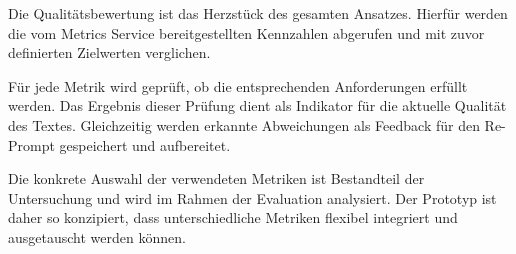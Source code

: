 
Die Qualitätsbewertung ist das Herzstück des gesamten Ansatzes.
Hierfür werden die vom Metrics Service bereitgestellten Kennzahlen abgerufen und mit zuvor definierten Zielwerten verglichen.

Für jede Metrik wird geprüft, ob die entsprechenden Anforderungen erfüllt werden.
Das Ergebnis dieser Prüfung dient als Indikator für die aktuelle Qualität des Textes.
Gleichzeitig werden erkannte Abweichungen als Feedback für den Re-Prompt gespeichert und aufbereitet.

Die konkrete Auswahl der verwendeten Metriken ist Bestandteil der Untersuchung und wird im Rahmen der Evaluation analysiert.
Der Prototyp ist daher so konzipiert, dass unterschiedliche Metriken flexibel integriert und ausgetauscht werden können.